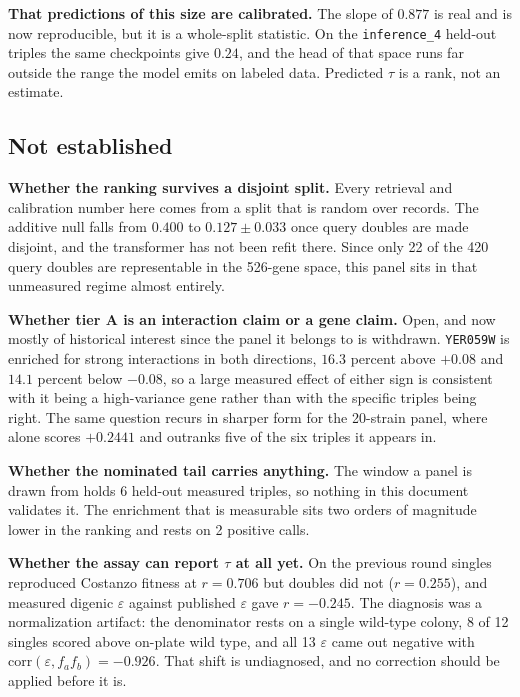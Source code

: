\textbf{That predictions of this size are calibrated.} The slope of $0.877$ is
real and is now reproducible, but it is a whole-split statistic. On the
\texttt{inference\_4} held-out triples the same checkpoints give $0.24$, and the
head of that space runs far outside the range the model emits on labeled data.
Predicted $\tau$ is a rank, not an estimate.

\subsection{Not established}

\textbf{Whether the ranking survives a disjoint split.} Every retrieval and
calibration number here comes from a split that is random over records. The
additive null falls from $0.400$ to $0.127 \pm 0.033$ once query doubles are made
disjoint, and the transformer has not been refit there. Since only 22 of the 420
query doubles are representable in the 526-gene space, this panel sits in that
unmeasured regime almost entirely.

\textbf{Whether tier A is an interaction claim or a gene claim.} Open, and now
mostly of historical interest since the panel it belongs to is withdrawn.
\texttt{YER059W} is enriched for strong interactions in both directions,
$16.3$ percent above $+0.08$ and $14.1$ percent below $-0.08$, so a large
measured effect of either sign is consistent with it being a high-variance gene
rather than with the specific triples being right. The same question recurs in
sharper form for the 20-strain panel, where  alone scores $+0.2441$
and outranks five of the six triples it appears in.

\textbf{Whether the nominated tail carries anything.} The window a panel is drawn
from holds 6 held-out measured triples, so nothing in this document validates it.
The enrichment that is measurable sits two orders of magnitude lower in the
ranking and rests on 2 positive calls.

\textbf{Whether the assay can report $\tau$ at all yet.} On the previous round
singles reproduced Costanzo fitness at $r = 0.706$ but doubles did not
($r = 0.255$), and measured digenic $\varepsilon$ against published
$\varepsilon$ gave $r = -0.245$. The diagnosis was a normalization artifact: the
denominator rests on a single wild-type colony, 8 of 12 singles scored above
on-plate wild type, and all 13 $\varepsilon$ came out negative with
$\mathrm{corr}(\varepsilon, f_a f_b) = -0.926$. That shift is undiagnosed, and no
correction should be applied before it is.

